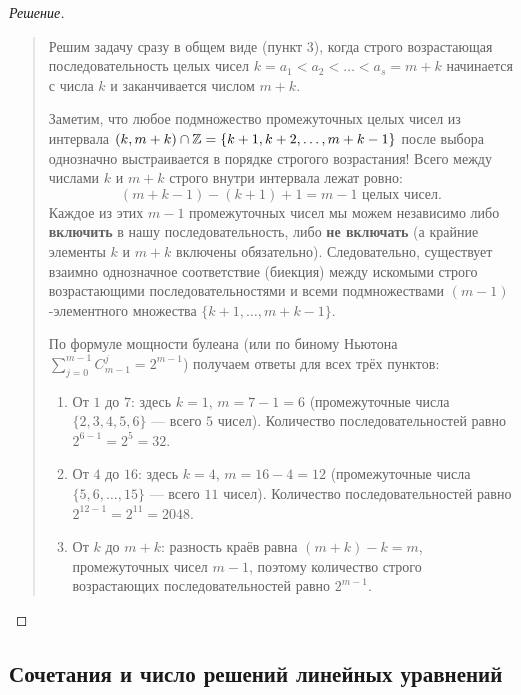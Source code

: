 \begin{proof}[Решение]~\\
    \begin{quote}
        Решим задачу сразу в общем виде (пункт 3), когда строго 
        возрастающая последовательность целых чисел 
        $k = a_1 < a_2 < \dots < a_s = m + k$ начинается с числа $k$ и 
        заканчивается числом $m + k$.

        Заметим, что любое подмножество промежуточных целых чисел из 
        интервала $(k, m + k) \cap \mathbb{Z} = \{k + 1, k + 2, \dots, m + k - 1\}$ 
        после выбора однозначно выстраивается в порядке строгого 
        возрастания! Всего между числами $k$ и $m + k$ строго внутри 
        интервала лежат ровно:
        \[
            (m + k - 1) - (k + 1) + 1 = m - 1 \text{ целых чисел.}
        \]
        Каждое из этих $m - 1$ промежуточных чисел мы можем независимо 
        либо \textbf{включить} в нашу последовательность, либо 
        \textbf{не включать} (а крайние элементы $k$ и $m + k$ включены 
        обязательно). Следовательно, существует взаимно однозначное 
        соответствие (биекция) между искомыми строго возрастающими 
        последовательностями и всеми подмножествами $(m - 1)$-элементного 
        множества $\{k + 1, \dots, m + k - 1\}$.

        По формуле мощности булеана (или по биному Ньютона 
        $\sum_{j=0}^{m-1} C_{m-1}^j = 2^{m-1}$) получаем ответы для всех 
        трёх пунктов:
        \begin{enumerate}
            \item От $1$ до $7$: здесь $k = 1$, $m = 7 - 1 = 6$ 
            (промежуточные числа $\{2, 3, 4, 5, 6\}$ --- всего $5$ чисел). 
            Количество последовательностей равно $2^{6-1} = 2^5 = 32$.
            \item От $4$ до $16$: здесь $k = 4$, $m = 16 - 4 = 12$ 
            (промежуточные числа $\{5, 6, \dots, 15\}$ --- всего $11$ чисел). 
            Количество последовательностей равно $2^{12-1} = 2^{11} = 2048$.
            \item От $k$ до $m + k$: разность краёв равна $(m + k) - k = m$, 
            промежуточных чисел $m - 1$, поэтому количество строго 
            возрастающих последовательностей равно $2^{m-1}$.
        \end{enumerate}
    \end{quote}
\end{proof}

\subsection{Сочетания и число решений линейных уравнений}

